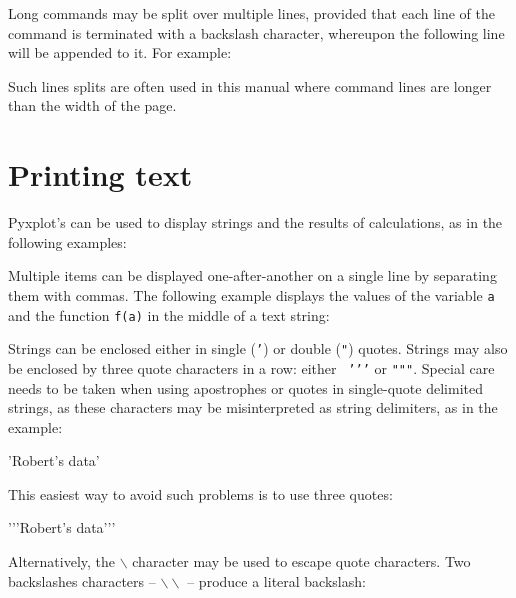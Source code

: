 Long commands may be split over multiple lines, provided that each line of the
command is terminated with a backslash character, whereupon the following line
will be appended to it. For example:

\vspace{3mm}

\vspace{3mm}

\noindent Such lines splits are often used in this manual where command lines
are longer than the width of the page.

\section{Printing text}
\label{sec:text_escaping}

Pyxplot's  can be used to display strings and the results of
calculations, as in the following examples:

\vspace{3mm}

\vspace{3mm}

Multiple items can be displayed one-after-another on a single line by
separating them with commas. The following example displays the values of the
variable {\tt a} and the function {\tt f(a)} in the middle of a text string:

\vspace{3mm}

\vspace{3mm}

Strings can be enclosed either in single ({\tt '}) or double ({\tt "}) quotes.
Strings may also be enclosed by three quote characters in a row: either {\tt
\textquoteright\textquoteright\textquoteright} or {\tt """}. Special care needs
to be taken when using apostrophes or quotes in single-quote delimited strings,
as these characters may be misinterpreted as string delimiters, as in the
example:

\begin{dontdo}
'Robert's data'
\end{dontdo}

\noindent This easiest way to avoid such problems is to use three quotes:

\begin{dodo}
\textquoteright\textquoteright\textquoteright Robert's data\textquoteright\textquoteright\textquoteright
\end{dodo}

\noindent Alternatively, the {\tt $\backslash$} character may be used to escape
quote characters. Two backslashes characters -- {\tt $\backslash\backslash$} --
produce a literal backslash:

